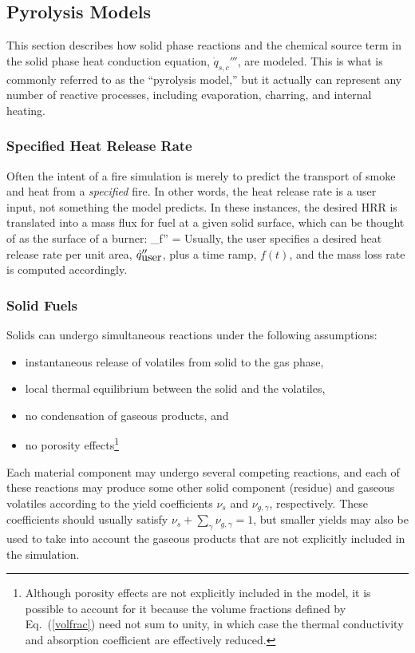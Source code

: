 \documentclass[11pt]{book}
\begin{document}
\subsection{Pyrolysis Models}
\label{pyrosection}

This section describes how solid phase reactions and the chemical
source term in the solid phase heat conduction equation,
$\dot{q}_{s,c}'''$,  are modeled. This is what is commonly referred to
as the ``pyrolysis model,'' but it actually can represent any number
of reactive processes, including evaporation, charring, and internal
heating.


\subsubsection{Specified Heat Release Rate}

Often the intent of a fire simulation is merely to predict the
transport of smoke and heat from a {\em specified} fire. In other
words, the heat release rate is a user input, not something the model
predicts. In these instances, the desired HRR is translated into a
mass flux for fuel at a given solid surface, which can be thought of
as the surface of a burner: \be \dm_f'' =  \ee Usually, the user specifies a
desired heat release rate per unit area, $\dot{q}_{\hbox{user}}''$, plus a
time ramp, $f(t)$, and the mass loss rate is computed accordingly.

\subsubsection{Solid Fuels}

Solids can undergo simultaneous reactions under the following assumptions:
\begin{itemize}
\setlength{\itemsep}{0.0in}
\item instantaneous release of volatiles from solid to the gas phase,
\item local thermal equilibrium between the solid and the volatiles,
\item no condensation of gaseous products, and
\item no porosity effects\footnote{Although porosity effects are not explicitly included in the model, it is possible to account for it
because the volume fractions defined by Eq.~(\ref{volfrac}) need not
sum to unity, in which case the thermal conductivity and absorption
coefficient are effectively reduced.}
\end{itemize}
Each material component may undergo several competing reactions, and
each of these reactions may produce some other solid component
(residue) and gaseous volatiles according to the yield coefficients
$\nu_s$ and $\nu_{g,\gamma}$, respectively.  These coefficients should
usually satisfy $\nu_s + \sum_\gamma \nu_{g,\gamma} = 1$, but smaller yields may
also be used to take into account the gaseous products that are not
explicitly included in the simulation.
\end{document}
